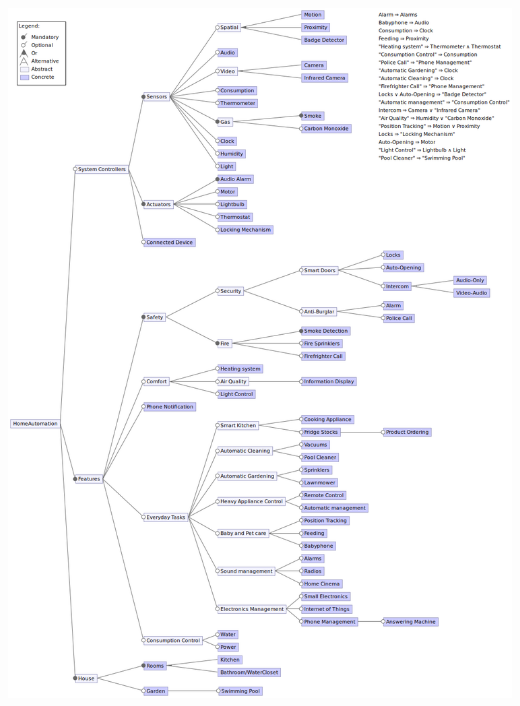   \newpage
  \begin{appendices}
    \begin{changemargin}{-2cm}{-3cm}
      \includegraphics[width=\textwidth]{featuremodel_revisited}
    \end{changemargin}
  \end{appendices}


